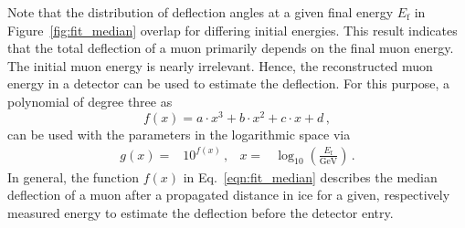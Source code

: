 Note that the distribution of deflection angles at a given final energy $E_{\mathrm{f}}$ in Figure~\ref{fig:fit_median} overlap for differing initial energies. This result indicates that the total deflection of a muon 
primarily depends on the final muon energy.
The initial muon energy is nearly irrelevant. 
Hence, the reconstructed muon 
energy in a detector can be used to estimate the deflection. For this 
purpose, a polynomial of degree three as 
\begin{equation}
     f(x) = a \cdot x^3 + b \cdot x^2 + c \cdot x + d \,,
    \label{eqn:fit_median}
\end{equation} 
can be used with the parameters 
in the logarithmic space via 
\begin{align}
    g(x) =& 10^{f(x)}\,, & x =& \log_{10}\left(\frac{E_{\text{f}}}{\si{\giga\electronvolt}}\right)\,.
\end{align}
In general, the function $f(x)$ in Eq.~\eqref{eqn:fit_median} describes the median 
deflection of a muon after a propagated distance in ice for a given, respectively measured energy 
to estimate the deflection before the detector entry. 

